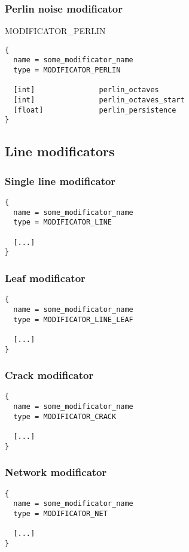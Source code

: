 \documentclass[11pt]{article}
\begin{document}
\subsubsection{Perlin noise modificator}
MODIFICATOR\_PERLIN

\begin{verbatim}
{
  name = some_modificator_name
  type = MODIFICATOR_PERLIN

  [int]               perlin_octaves
  [int]               perlin_octaves_start
  [float]             perlin_persistence
}
\end{verbatim}

\subsection{Line modificators}
\subsubsection{Single line modificator}

\begin{verbatim}
{
  name = some_modificator_name
  type = MODIFICATOR_LINE

  [...]
}
\end{verbatim}

\subsubsection{Leaf modificator}

\begin{verbatim}
{
  name = some_modificator_name
  type = MODIFICATOR_LINE_LEAF

  [...]
}
\end{verbatim}

\subsubsection{Crack modificator}

\begin{verbatim}
{
  name = some_modificator_name
  type = MODIFICATOR_CRACK

  [...]
}
\end{verbatim}

\subsubsection{Network modificator}

\begin{verbatim}
{
  name = some_modificator_name
  type = MODIFICATOR_NET

  [...]
}
\end{verbatim}
\end{document}
